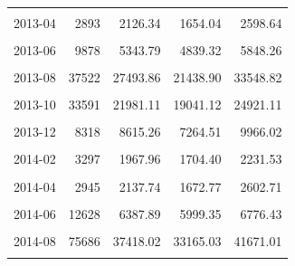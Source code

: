 \begin{longtable}[t]{crrrr}
\cellcolor{gray!10}{2013-03} & \cellcolor{gray!10}{4054} & \cellcolor{gray!10}{2408.94} & \cellcolor{gray!10}{2121.31} & \cellcolor{gray!10}{2696.57}\\
2013-04 & 2893 & 2126.34 & 1654.04 & 2598.64\\
\cellcolor{gray!10}{2013-05} & \cellcolor{gray!10}{7089} & \cellcolor{gray!10}{3819.63} & \cellcolor{gray!10}{3535.57} & \cellcolor{gray!10}{4103.70}\\
2013-06 & 9878 & 5343.79 & 4839.32 & 5848.26\\
\cellcolor{gray!10}{2013-07} & \cellcolor{gray!10}{15743} & \cellcolor{gray!10}{11184.92} & \cellcolor{gray!10}{7842.10} & \cellcolor{gray!10}{14527.74}\\
2013-08 & 37522 & 27493.86 & 21438.90 & 33548.82\\
\cellcolor{gray!10}{2013-09} & \cellcolor{gray!10}{59535} & \cellcolor{gray!10}{35994.17} & \cellcolor{gray!10}{32437.70} & \cellcolor{gray!10}{39550.63}\\
2013-10 & 33591 & 21981.11 & 19041.12 & 24921.11\\
\cellcolor{gray!10}{2013-11} & \cellcolor{gray!10}{10179} & \cellcolor{gray!10}{13942.46} & \cellcolor{gray!10}{11954.80} & \cellcolor{gray!10}{15930.13}\\
2013-12 & 8318 & 8615.26 & 7264.51 & 9966.02\\
\cellcolor{gray!10}{2014-01} & \cellcolor{gray!10}{4073} & \cellcolor{gray!10}{3003.45} & \cellcolor{gray!10}{2635.75} & \cellcolor{gray!10}{3371.14}\\
2014-02 & 3297 & 1967.96 & 1704.40 & 2231.53\\
\cellcolor{gray!10}{2014-03} & \cellcolor{gray!10}{3724} & \cellcolor{gray!10}{2346.67} & \cellcolor{gray!10}{2052.76} & \cellcolor{gray!10}{2640.58}\\
2014-04 & 2945 & 2137.74 & 1672.77 & 2602.71\\
\cellcolor{gray!10}{2014-05} & \cellcolor{gray!10}{5266} & \cellcolor{gray!10}{2978.45} & \cellcolor{gray!10}{2619.23} & \cellcolor{gray!10}{3337.66}\\
2014-06 & 12628 & 6387.89 & 5999.35 & 6776.43\\
\cellcolor{gray!10}{2014-07} & \cellcolor{gray!10}{18671} & \cellcolor{gray!10}{12581.19} & \cellcolor{gray!10}{10136.18} & \cellcolor{gray!10}{15026.19}\\
2014-08 & 75686 & 37418.02 & 33165.03 & 41671.01\\
\cellcolor{gray!10}{2014-09} & \cellcolor{gray!10}{84087} & \cellcolor{gray!10}{41910.11} & \cellcolor{gray!10}{39007.11} & \cellcolor{gray!10}{44813.10}\\

\end{longtable}
